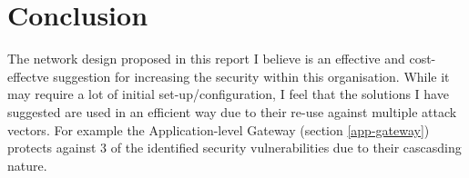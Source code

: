 \documentclass[11pt]{article}
\begin{document}
    \section{Conclusion}
      The network design proposed in this report I believe is an effective and cost-effectve suggestion for increasing the security within this organisation. While it may require a lot of initial set-up/configuration, I feel that the solutions I have suggested are used in an efficient way due to their re-use against multiple attack vectors. For example the Application-level Gateway (section \ref{app-gateway}) protects against 3 of the identified security vulnerabilities due to their cascasding nature.

  \newpage

  
  
\end{document}
